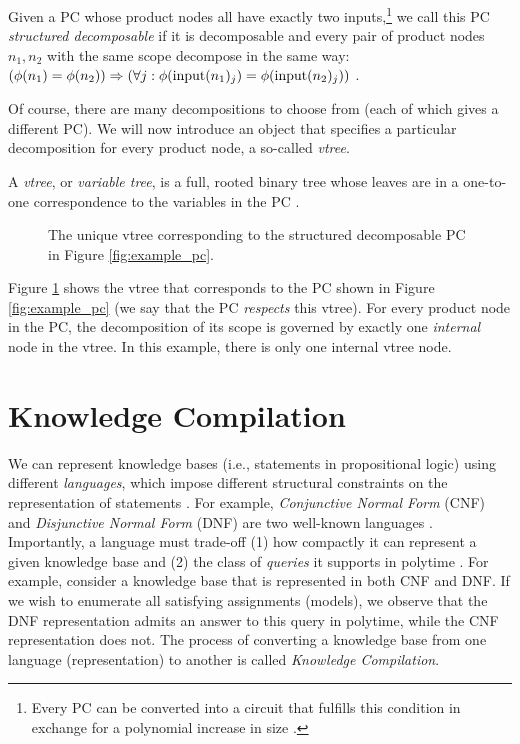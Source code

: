 \begin{definition}
    Given a PC whose product nodes all have exactly two inputs,\footnote{Every PC can be converted into a circuit that fulfills this condition in exchange for a polynomial increase in size \cite{compositional_atlas}.} we call this PC \textit{structured decomposable} if it is decomposable and every pair of product nodes $n_1, n_2$ with the same scope decompose in the same way: $(\phi(n_1) = \phi(n_2)) \Rightarrow (\forall j: \phi(\operatorname{input}(n_1)_j) = \phi(\operatorname{input}(n_2)_j))$ \cite{pc_intro}.
\end{definition}

Of course, there are many decompositions to choose from (each of which gives a different PC). We will now introduce an object that specifies a particular decomposition for every product node, a so-called \textit{vtree}.

\begin{definition}[Vtree]
    A \textit{vtree}, or \textit{variable tree}, is a full, rooted binary tree whose leaves are in a one-to-one correspondence to the variables in the PC \cite{new_comp_lang}.
\end{definition}

\begin{figure}[ht]
    \centering
    \scalebox{1.25}{
        
    }
    \caption{The unique vtree corresponding to the structured decomposable PC in Figure \ref{fig:example_pc}.}
    \label{fig:vtree_example}
\end{figure}

Figure \ref{fig:vtree_example} shows the vtree that corresponds to the PC shown in Figure \ref{fig:example_pc} (we say that the PC \textit{respects} this vtree). For every product node in the PC, the decomposition of its scope is governed by exactly one \textit{internal} node in the vtree. In this example, there is only one internal vtree node.

\section{Knowledge Compilation}

We can represent knowledge bases (i.e., statements in propositional logic) using different \emph{languages}, which impose different structural constraints on the representation of statements \cite{kcm}. For example, \emph{Conjunctive Normal Form} (CNF) and \emph{Disjunctive Normal Form} (DNF) are two well-known languages \cite{kcm}. Importantly, a language must trade-off (1) how compactly it can represent a given knowledge base and (2) the class of \emph{queries} it supports in polytime \cite{kcm}. For example, consider a knowledge base that is represented in both CNF and DNF. If we wish to enumerate all satisfying assignments (models), we observe that the DNF representation admits an answer to this query in polytime, while the CNF representation does not. The process of converting a knowledge base from one language (representation) to another is called \emph{Knowledge Compilation}.

